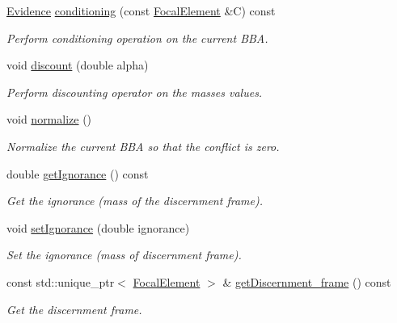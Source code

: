 \begin{DoxyCompactItemize}
\hyperlink{classEvidence}{Evidence} \hyperlink{classEvidence_a1ad5b5d0d7df6fee326ba30aa4b015c6}{conditioning} (const \hyperlink{classFocalElement}{Focal\+Element} \&C) const 
\begin{DoxyCompactList}\small\item\em Perform conditioning operation on the current B\+BA. \end{DoxyCompactList}\item 
void \hyperlink{classEvidence_afaa46e0ce034a05c4749c7021430d60a}{discount} (double alpha)
\begin{DoxyCompactList}\small\item\em Perform discounting operator on the masses values. \end{DoxyCompactList}\item 
void \hyperlink{classEvidence_aa6a44be2f65aa439e2bdcf9333659abb}{normalize} ()
\begin{DoxyCompactList}\small\item\em Normalize the current B\+BA so that the conflict is zero. \end{DoxyCompactList}\item 
double \hyperlink{classEvidence_a2d6b2109c1347c004d00c2ef6bd515d8}{get\+Ignorance} () const 
\begin{DoxyCompactList}\small\item\em Get the ignorance (mass of the discernment frame). \end{DoxyCompactList}\item 
void \hyperlink{classEvidence_a11377c6946b7727015936b35dcf86cc8}{set\+Ignorance} (double ignorance)
\begin{DoxyCompactList}\small\item\em Set the ignorance (mass of discernment frame). \end{DoxyCompactList}\item 
const std\+::unique\+\_\+ptr$<$ \hyperlink{classFocalElement}{Focal\+Element} $>$ \& \hyperlink{classEvidence_a875150a8830c15d0cf3391d73889214e}{get\+Discernment\+\_\+frame} () const 
\begin{DoxyCompactList}\small\item\em Get the discernment frame. \end{DoxyCompactList}\end{DoxyCompactItemize}
